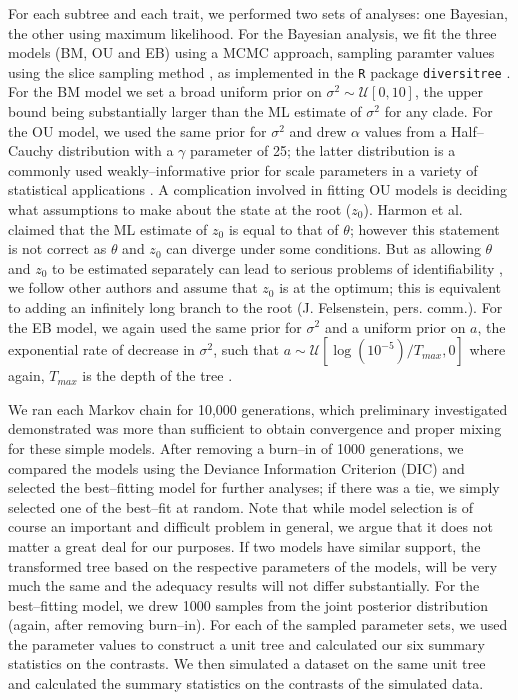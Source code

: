 \documentclass[a4paper,12pt]{article}
\begin{document}
For each subtree and each trait, we performed two sets of analyses: one Bayesian, the other using maximum likelihood. For the Bayesian analysis, we fit the three models (BM, OU and EB) using a MCMC approach, sampling paramter values using the slice sampling method \citep{Nealslice}, as implemented in the \texttt{R} package \texttt{diversitree} \citep{FitzJohn2012}. For the BM model we set a broad uniform prior on $\sigma^2 \sim \mathcal{U}[0, 10]$, the upper bound being substantially larger than the ML estimate of $\sigma^2$ for any clade. For the OU model, we used the same prior for $\sigma^2$ and drew $\alpha$ values from a Half--Cauchy distribution with a $\gamma$ parameter of 25; the latter distribution is a commonly used weakly--informative prior for scale parameters in a variety of statistical applications \citep{Gelmanprior, Polson2012}. A complication involved in fitting OU models is deciding what assumptions to make about the state at the root ($z_0$). Harmon et al. \citep{Harmon2010} claimed that the ML estimate of $z_0$ is equal to that of $\theta$; however this statement is not correct as $\theta$ and $z_0$ can diverge under some conditions. But as allowing $\theta$ and $z_0$ to be estimated separately can lead to serious problems of identifiability \citep{HoAne2012}, we follow other authors \citep{Labra2009, Beaulieu2012} and assume that $z_0$ is at the optimum; this is equivalent to adding an infinitely long branch to the root (J. Felsenstein, pers. comm.). For the EB model, we again used the same prior for $\sigma^2$ and a uniform prior on $a$, the exponential rate of decrease in $\sigma^2$, such that $a \sim \mathcal{U}[\log (10^{-5})/T_{max}, 0]$ where again, $T_{max}$ is the depth of the tree \citep{SlaterPennell}.

We ran each Markov chain for 10,000 generations, which preliminary investigated demonstrated was more than sufficient to obtain convergence and proper mixing for these simple models. After removing a burn--in of 1000 generations, we compared the models using the Deviance Information Criterion (DIC) \citep{dic} and selected the best--fitting model for further analyses; if there was a tie, we simply selected one of the best--fit at random. Note that while model selection is of course an important and difficult problem in general, we argue that it does not matter a great deal for our purposes. If two models have similar support, the transformed tree based on the respective parameters of the models, will be very much the same and the adequacy results will not differ substantially. For the best--fitting model, we drew 1000 samples from the joint posterior distribution (again, after removing burn--in). For each of the sampled parameter sets, we used the parameter values to construct a unit tree and calculated our six summary statistics on the contrasts. We then simulated a dataset on the same unit tree and calculated the summary statistics on the contrasts of the simulated data.
 
\end{document}
